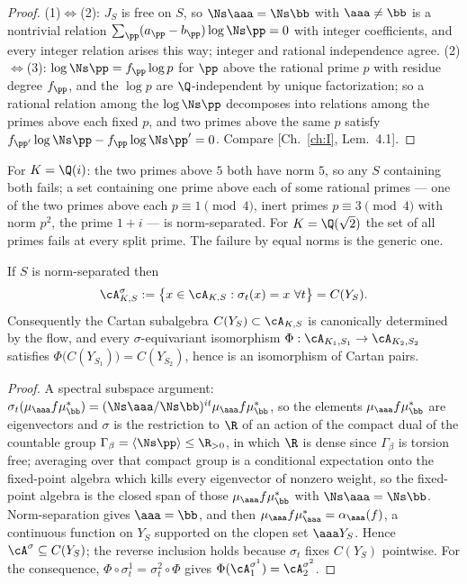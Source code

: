\begin{proof}
(1)$\Leftrightarrow$(2): $J_S$ is free on $S$, so $\Ns\aaa=\Ns\bb$ with $\aaa\ne\bb$ is a
nontrivial relation $\sum_\pp(a_\pp-b_\pp)\log\Ns\pp=0$ with integer coefficients, and every
integer relation arises this way; integer and rational independence agree.
(2)$\Leftrightarrow$(3): $\log\Ns\pp=f_\pp\log p$ for $\pp$ above the rational prime $p$ with
residue degree $f_\pp$, and the $\log p$ are $\Q$-independent by unique factorization; so
a rational relation among the $\log\Ns\pp$ decomposes into relations among the primes above
each fixed $p$, and two primes above the same $p$ satisfy
$f_{\pp'}\log\Ns\pp-f_\pp\log\Ns\pp'=0$. Compare [Ch.~\ref{ch:I}, Lem.~4.1].
\end{proof}

\begin{example}\label{XIII:ex:fail}
For $K=\Q(i)$: the two primes above $5$ both have norm $5$, so any $S$ containing both fails;
a set containing one prime above each of some rational primes --- one of the two primes
above each $p\equiv1\pmod4$, inert primes $p\equiv3\pmod4$ with norm $p^2$, the prime $1+i$
--- is norm-separated. For $K=\Q(\sqrt2)$ the set of all primes fails at every split prime.
The failure by equal norms is the generic one.
\end{example}

\begin{theorem}\label{XIII:thm:fixed}
If $S$ is norm-separated then
\begin{equation}\label{XIII:eq:fixed}
\cA_{K,S}^{\sigma}:=\bigl\{x\in\cA_{K,S}:\sigma_t(x)=x\ \forall t\bigr\}=C(Y_S).
\end{equation}
Consequently the Cartan subalgebra $C(Y_S)\subset\cA_{K,S}$ is canonically determined by
the flow, and every $\sigma$-equivariant isomorphism
$\Phi:\cA_{K_1,S_1}\to\cA_{K_2,S_2}$ satisfies $\Phi\bigl(C(Y_{S_1})\bigr)=C(Y_{S_2})$, hence
is an isomorphism of Cartan pairs.
\end{theorem}

\begin{proof}
A spectral subspace argument: $\sigma_t(\mu_\aaa f\mu_\bb^*)=(\Ns\aaa/\Ns\bb)^{it}\mu_\aaa f\mu_\bb^*$,
so the elements $\mu_\aaa f\mu_\bb^*$ are eigenvectors and $\sigma$ is the restriction to
$\R$ of an action of the compact dual of the countable group $\Gamma_\beta=\langle\Ns\pp\rangle\le\R_{>0}$,
in which $\R$ is dense since $\Gamma_\beta$ is torsion free; averaging over that compact group
is a conditional expectation onto the fixed-point algebra which kills every eigenvector of
nonzero weight, so the fixed-point algebra is the closed span of those $\mu_\aaa f\mu_\bb^*$
with $\Ns\aaa=\Ns\bb$. Norm-separation gives $\aaa=\bb$, and then
$\mu_\aaa f\mu_\aaa^*=\alpha_\aaa(f)$, a continuous function on $Y_S$ supported on the clopen
set $\aaa Y_S$. Hence $\cA^\sigma\subseteq C(Y_S)$; the reverse inclusion holds because
$\sigma_t$ fixes $C(Y_S)$ pointwise. For the consequence, $\Phi\circ\sigma^1_t=\sigma^2_t\circ\Phi$
gives $\Phi(\cA_1^{\sigma^1})=\cA_2^{\sigma^2}$.
\end{proof}

